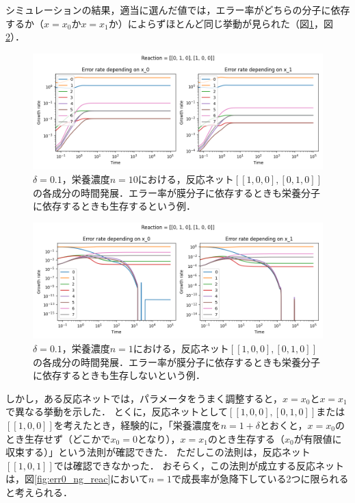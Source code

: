 \documentclass[a4paper,11pt]{jsarticle}
\begin{document}
シミュレーションの結果，適当に選んだ値では，エラー率がどちらの分子に依存するか（$x=x_0$か$x=x_1$か）によらずほとんど同じ挙動が見られた（図\ref{fig:errslp01_tc_reac1_n10}，図\ref{fig:errslp01_tc_reac1_n1}）．

\begin{figure}[htbp]
  \centering
  \includegraphics[width=\columnwidth]{waste_errslp01_tc_reac1_n10.png}
  \caption{$\delta=0.1$，栄養濃度$n=10$における，反応ネット$[[1,0,0],[0,1,0]]$の各成分の時間発展．エラー率が膜分子に依存するときも栄養分子に依存するときも生存するという例．}
  \label{fig:errslp01_tc_reac1_n10}
\end{figure}

\begin{figure}[htbp]
  \centering
  \includegraphics[width=\columnwidth]{waste_errslp01_tc_reac1_n1.png}
  \caption{$\delta=0.1$，栄養濃度$n=1$における，反応ネット$[[1,0,0],[0,1,0]]$の各成分の時間発展．エラー率が膜分子に依存するときも栄養分子に依存するときも生存しないという例．}
  \label{fig:errslp01_tc_reac1_n1}
\end{figure}

しかし，ある反応ネットでは，パラメータをうまく調整すると，$x=x_0$と$x=x_1$で異なる挙動を示した．
とくに，反応ネットとして$[[1,0,0],[0,1,0]]$または$[[1,0,0]]$を考えたとき，経験的に，「栄養濃度を$n=1+\delta$とおくと，$x=x_0$のとき生存せず（どこかで$x_0=0$となり），$x=x_1$のとき生存する（$x_0$が有限値に収束する）」という法則が確認できた．
ただしこの法則は，反応ネット$[[1,0,1]]$では確認できなかった．
おそらく，この法則が成立する反応ネットは，図\ref{fig:err0_ng_reac}において$n=1$で成長率が急降下している2つに限られると考えられる．
\end{document}

